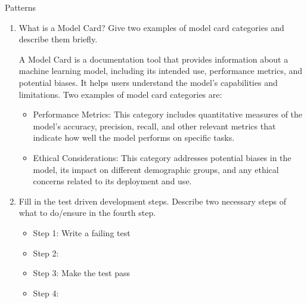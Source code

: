 \documentclass{article}
\begin{document}
\begin{exercise}{Patterns}
\begin{enumerate}
    \item What is a Model Card? Give two examples of model card categories and describe them briefly. \begin{solution}
        A Model Card is a documentation tool that provides information about a machine learning model, including its intended use, performance metrics, and potential biases. It helps users understand the model's capabilities and limitations.
        Two examples of model card categories are:
        \begin{itemize}
          \item Performance Metrics: This category includes quantitative measures of the model's accuracy, precision, recall, and other relevant metrics that indicate how well the model performs on specific tasks.
          \item Ethical Considerations: This category addresses potential biases in the model, its impact on different demographic groups, and any ethical concerns related to its deployment and use.
        \end{itemize}
      \end{solution}

    \item Fill in the test driven development steps. Describe two necessary steps of what to do/ensure in the fourth step.
      \begin{itemize}
        \item Step 1: Write a failing test
        \item Step 2: \ 
        \item Step 3: Make the test pass
        \item Step 4: \ 
      \end{itemize}


\end{enumerate}
\end{exercise}
\end{document}
